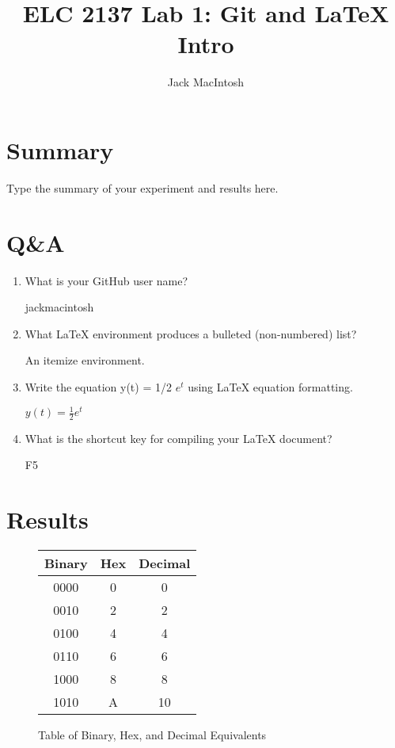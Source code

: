 \documentclass[11pt]{article}
\begin{document}
\title{ELC 2137 Lab 1: Git and LaTeX Intro}
\author{Jack MacIntosh}

\maketitle


\section*{Summary}

Type the summary of your experiment and results here.  


\section*{Q\&A}

\begin{enumerate}
	\item What is your GitHub user name?
	
	jackmacintosh
	
	\item What LaTeX environment produces a bulleted (non-numbered) list?
	
	An itemize environment.
	
	\item Write the equation y(t) = 1/2 $e^t$ using LaTeX equation formatting.
	
 	$y(t) = \frac{1}{2}e^t$
 	
 	\item What is the shortcut key for compiling your LaTeX document?
 	
 	F5
\end{enumerate}


\section*{Results}

\begin{figure}[ht]\centering
	\begin{center}
		\begin{tabular}{c|c|c}
			Binary & Hex & Decimal \\
			\toprule
			0000 & 0 & 0 \\
			0010 & 2 & 2 \\
			0100 & 4 & 4 \\
			0110 & 6 & 6 \\
			1000 & 8 & 8 \\
			1010 & A & 10 \\
			\bottomrule
		
		\end{tabular} 
		\caption{Table of Binary, Hex, and Decimal Equivalents}
	\end{center}
\end{figure}
\end{document}
